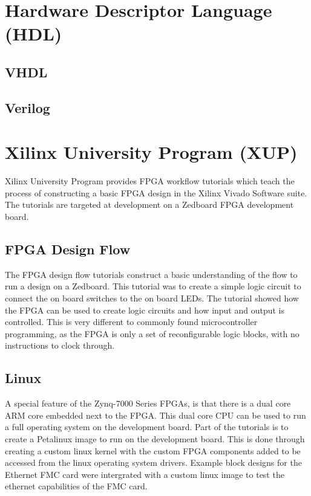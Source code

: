 \section{Hardware Descriptor Language (HDL)}
\subsection{VHDL}
\subsection{Verilog}
\section{Xilinx University Program (XUP)}

\par Xilinx University Program provides FPGA workflow tutorials which teach the process of constructing a basic FPGA 
design in the Xilinx Vivado Software suite. The tutorials are targeted at development on a Zedboard FPGA development 
board.

\subsection{FPGA Design Flow}

\par The FPGA design flow tutorials construct a basic understanding of the flow to run a design on a Zedboard. 
This tutorial was to create a simple logic circuit to connect the on board switches to the on board LEDs. 
The tutorial showed how the FPGA can be used to create logic circuits and how input and output is controlled.
This is very different to commonly found microcontroller programming, as the FPGA is only a set of reconfigurable
logic blocks, with no instructions to clock through.

\subsection{Linux}

\par A special feature of the Zynq-7000 Series FPGAs, is that there is a dual core ARM core embedded next to the FPGA.
This dual core CPU can be used to run a full operating system on the development board. Part of the tutorials is 
to create a Petalinux image to run on the development board. This is done through creating a custom linux kernel with
the custom FPGA components added to be accessed from the linux operating system drivers. Example block designs
for the Ethernet FMC card were intergrated with a custom linux image to test the ethernet capabilities of the FMC 
card.

